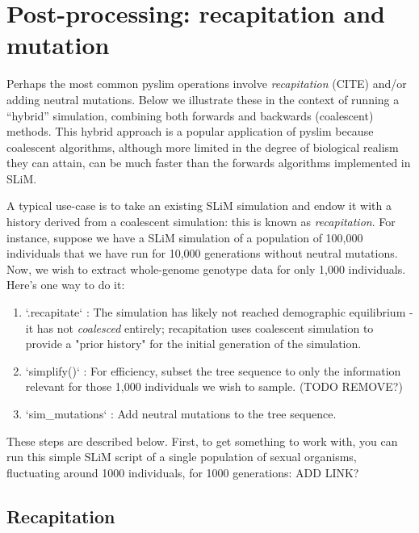 \documentclass[12pt]{article}
\begin{document}
\section*{Post-processing: recapitation and mutation}

Perhaps the most common pyslim operations involve \textit{recapitation} (CITE)
and/or adding neutral mutations.
Below we illustrate these in the context of running a ``hybrid'' simulation, combining
both forwards and backwards (coalescent) methods. This hybrid approach is a popular
application of pyslim because coalescent algorithms, although more limited in the degree
of biological realism they can attain, can be much faster than the forwards algorithms
implemented in SLiM.

A typical use-case is to take an existing SLiM simulation and endow
it with a history derived from a coalescent simulation: this is known as \textit{recapitation}.
For instance, suppose we have a SLiM simulation of a population of 100,000 individuals
that we have run for 10,000 generations without neutral mutations. Now, we wish to
extract whole-genome genotype data for only 1,000 individuals. Here's one way to do it:

\begin{enumerate}
    \item `.recapitate` :
       The simulation has likely not reached demographic equilibrium - it has not
        \textit{coalesced} entirely; recapitation uses coalescent simulation to provide
       a "prior history" for the initial generation of the simulation.

    \item `simplify()` : For efficiency, subset the tree
       sequence to only the information relevant for those 1,000 individuals
        we wish to sample. (TODO REMOVE?)

    \item `sim\_mutations` : Add neutral mutations to the tree sequence.
\end{enumerate}

These steps are described below. First, to get something to work with,
you can run this simple SLiM script of a single population of sexual organisms,
fluctuating around 1000 individuals, for 1000 generations: ADD LINK?


\subsection*{Recapitation}
\end{document}
